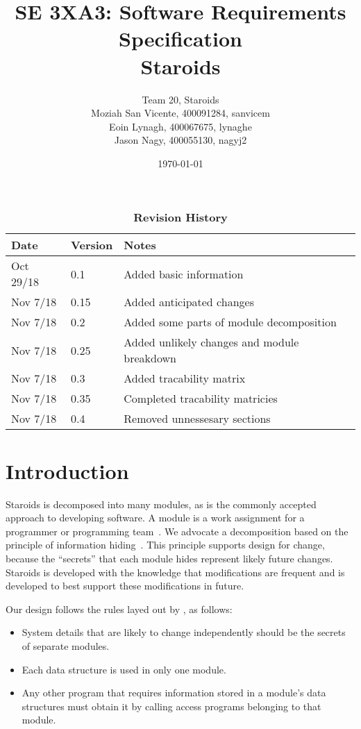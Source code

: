 \documentclass[12pt, titlepage]{article}
\title{SE 3XA3: Software Requirements Specification\\Staroids}
\author{Team 20, Staroids
  \\ Moziah San Vicente, 400091284, sanvicem
  \\ Eoin Lynagh, 400067675, lynaghe
  \\ Jason Nagy, 400055130, nagyj2
}
\date{\today}
\begin{document}
\maketitle

\tableofcontents
\listoftables
\listoffigures

\begin{table}[bp]
\caption{\bf Revision History}
\begin{tabularx}{\textwidth}{p{3cm}p{2cm}X}
\toprule {\bf Date} & {\bf Version} & {\bf Notes}\\
\midrule
Oct 29/18 & 0.1 & Added basic information\\
Nov 7/18 & 0.15 & Added anticipated changes\\
Nov 7/18 & 0.2 & Added some parts of module decomposition\\
Nov 7/18 & 0.25 & Added unlikely changes and module breakdown\\
Nov 7/18 & 0.3 & Added tracability matrix\\
Nov 7/18 & 0.35 & Completed tracability matricies\\
Nov 7/18 & 0.4 & Removed unnessesary sections\\
\bottomrule
\end{tabularx}
\end{table}

\newpage


\section{Introduction}

Staroids is decomposed into many modules, as is the commonly accepted approach to developing software. A module is a work assignment for a programmer or programming team~\citep{ParnasEtAl1984}. We advocate a decomposition based on the principle of information hiding~\citep{Parnas1972a}. This principle supports design for change, because the ``secrets'' that each module hides represent likely future changes. Staroids is developed with the knowledge that modifications are frequent and is developed to best support these modifications in future.

Our design follows the rules layed out by \citet{ParnasEtAl1984}, as follows:
\begin{itemize}
\item System details that are likely to change independently should be the secrets of separate modules.
\item Each data structure is used in only one module.
\item Any other program that requires information stored in a module's data structures must obtain it by calling access programs belonging to that module.
\end{itemize}
\end{document}
